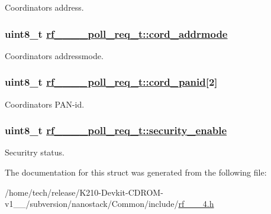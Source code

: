 Coordinators address. \hypertarget{structrf__802__15__4__poll__req__t_d8834b23b3a47d6183c90e1f2bf2bbf0}{
\subsubsection[cord\_\-addrmode]{\setlength{\rightskip}{0pt plus 5cm}uint8\_\-t \hyperlink{structrf__802__15__4__poll__req__t_d8834b23b3a47d6183c90e1f2bf2bbf0}{rf\_\_\_\_\-poll\_\-req\_\-t::cord\_\-addrmode}}}
\label{structrf__802__15__4__poll__req__t_d8834b23b3a47d6183c90e1f2bf2bbf0}


Coordinators addressmode. \hypertarget{structrf__802__15__4__poll__req__t_9d3a01a8f05572f8d05984c79ca61648}{
\subsubsection[cord\_\-panid]{\setlength{\rightskip}{0pt plus 5cm}uint8\_\-t \hyperlink{structrf__802__15__4__poll__req__t_9d3a01a8f05572f8d05984c79ca61648}{rf\_\_\_\_\-poll\_\-req\_\-t::cord\_\-panid}\mbox{[}2\mbox{]}}}
\label{structrf__802__15__4__poll__req__t_9d3a01a8f05572f8d05984c79ca61648}


Coordinators PAN-id. \hypertarget{structrf__802__15__4__poll__req__t_45a257887c33a9ab4551e27237f8c848}{
\subsubsection[security\_\-enable]{\setlength{\rightskip}{0pt plus 5cm}uint8\_\-t \hyperlink{structrf__802__15__4__poll__req__t_45a257887c33a9ab4551e27237f8c848}{rf\_\_\_\_\-poll\_\-req\_\-t::security\_\-enable}}}
\label{structrf__802__15__4__poll__req__t_45a257887c33a9ab4551e27237f8c848}


Securitry status. 

The documentation for this struct was generated from the following file:\begin{CompactItemize}
\item 
/home/tech/release/K210-Devkit-CDROM-v1\_\_/subversion/nanostack/Common/include/\hyperlink{rf__802__15__4_8h}{rf\_\_\_\-4.h}\end{CompactItemize}
